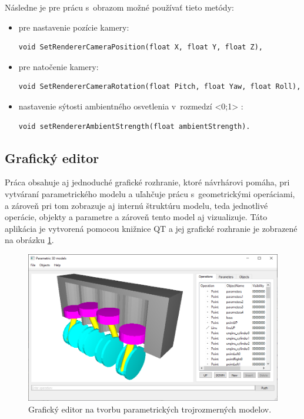Následne je pre prácu s~obrazom možné používať tieto metódy:
\begin{itemize}
\item pre nastavenie pozície kamery:
 \begin{lstlisting}
void SetRendererCameraPosition(float X, float Y, float Z),
\end{lstlisting}
\item pre natočenie kamery:
 \begin{lstlisting}
void SetRendererCameraRotation(float Pitch, float Yaw, float Roll),
\end{lstlisting}
\item nastavenie sýtosti ambientného osvetlenia v~rozmedzí <0;1> :
\begin{lstlisting}
void setRendererAmbientStrength(float ambientStrength).
\end{lstlisting}
\end{itemize}





\subsection*{Grafický editor}
\label{sec:grafickyEditor}

 
Práca obsahuje aj jednoduché grafické rozhranie, ktoré návrhárovi pomáha, pri vytváraní parametrického modelu a uľahčuje prácu s~geometrickými operáciami, a zároveň pri tom zobrazuje aj internú štruktúru modelu, teda jednotlivé operácie, objekty a parametre a zároveň tento model aj vizualizuje.
Táto aplikácia je vytvorená pomocou knižnice QT a jej grafické rozhranie je zobrazené na obrázku \ref{fig:GraphicEditor}.


\begin{figure}[H]
	\centering
	\includegraphics[width=1\textwidth]{obrazky-figures/Parametric_editor.png}
	\caption{Grafický editor na tvorbu parametrických trojrozmerných modelov.}
	\label{fig:GraphicEditor}
\end{figure}




